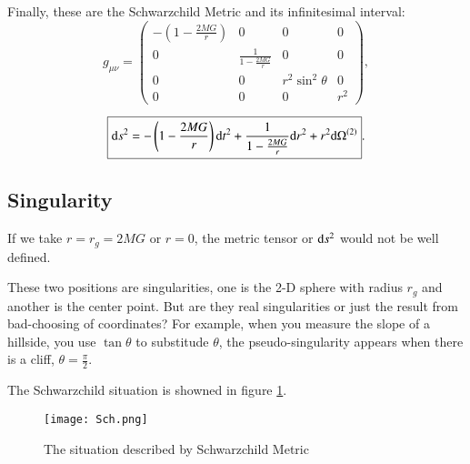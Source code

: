 \documentclass[openany,10pt]{book}
\theoremstyle{definition}
\theoremstyle{definition}
\theoremstyle{remark}
\begin{document}
Finally, these are the Schwarzchild Metric and its infinitesimal interval:
\begin{equation}
        g_{\mu\nu}=\begin{pmatrix}
   -\left(1-\frac{2MG}{r}\right) & 0 & 0 & 0\\
   0 & \frac{1}{1-\frac{2MG}{r}}& 0 & 0\\
   0 & 0 & r^2\sin^2{\theta} & 0\\
0 &0 & 0& r^2
  \end{pmatrix},
\end{equation}

\begin{equation}
 \boxed{{\rm d}s^2=-\left(1-\frac{2MG}{r}\right){\rm d}t^2+\frac{1}{1-\frac{2MG}{r}}{\rm d}r^2+r^2{\rm d}\Omega^{(2)}}.
\end{equation}

\subsection{Singularity}\label{Sch Ho}
If we take $r=r_g=2MG$ or $r=0$, the metric tensor or ${\rm d}s^2$ would not be well defined.


These two positions are singularities, one is the 2-D sphere with radius $r_g$ and another is the center point. But are they real singularities or just the result from bad-choosing of coordinates?  For example, when you measure the slope of a hillside, you use $\tan{\theta}$ to substitude $\theta$, the pseudo-singularity appears when there is a cliff, $\theta=\frac{\pi}{2}$. 

The Schwarzchild situation is showned in figure \ref{Sch sit}.
\begin{figure}[htbp]
    \centering
    \texttt{[image: Sch.png]}
    \caption{The situation described by Schwarzchild Metric}
    \label{Sch sit}
\end{figure}
\end{document}
